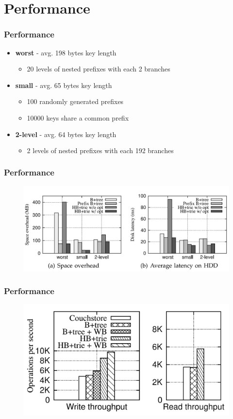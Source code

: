 \documentclass[aspectratio=169]{beamer}
\begin{document}
\section{Performance}
\begin{frame}[t]
	\frametitle{Performance}
	\begin{itemize}
		\item \textbf{worst} - avg. 198 bytes key length
		\begin{itemize}
			\item 20 levels of nested prefixes with each 2 branches
		\end{itemize}
		\item \textbf{small} - avg. 65 bytes key length
		\begin{itemize}
			\item 100 randomly generated prefixes
			\item 10000 keys share a common prefix
		\end{itemize}
		\item \textbf{2-level} - avg. 64 bytes key length
		\begin{itemize}
			\item 2 levels of nested prefixes with each 192 branches
		\end{itemize}
	\end{itemize}
\end{frame}
\begin{frame}[t]
    \frametitle{Performance}
    \begin{figure}[h!]
    	\includegraphics[scale=0.5]{comparision_bplus}
    \end{figure}
    \centering
\end{frame}
\begin{frame}[t]
	\frametitle{Performance}
	\begin{figure}[h!]
		\includegraphics[scale=0.35]{performance_rw}
	\end{figure}
	\centering
\end{frame}
\end{document}
